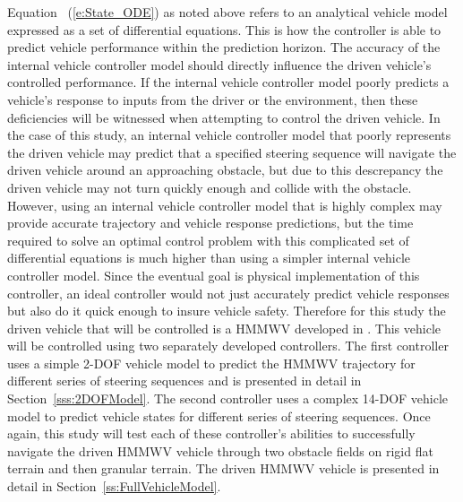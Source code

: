 \documentclass[12pt,twocolumn]{article}
\newcommand{\CHRONO}{{\sffamily{{Chrono}}}}
\begin{document}
Equation ~(\ref{e:State_ODE}) as noted above refers to an analytical vehicle model expressed as a set of differential equations. This is how the controller is able to predict vehicle performance within the prediction horizon. The accuracy of the internal vehicle controller model should directly influence the driven vehicle's controlled performance. If the internal vehicle controller model poorly predicts a vehicle's response to inputs from the driver or the environment, then these deficiencies will be witnessed when attempting to control the driven vehicle. In the case of this study, an internal vehicle controller model that poorly represents the driven vehicle may predict that a specified steering sequence will navigate the driven vehicle around an approaching obstacle, but due to this descrepancy the driven vehicle may not turn quickly enough and collide with the obstacle. However, using an internal vehicle controller model that is highly complex may provide accurate trajectory and vehicle response predictions, but the time required to solve an optimal control problem with this complicated set of differential equations is much higher than using a simpler internal vehicle controller model. Since the eventual goal is physical implementation of this controller, an ideal controller would not just accurately predict vehicle responses but also do it quick enough to insure vehicle safety. Therefore for this study the driven vehicle that will be controlled is a HMMWV developed in {\CHRONO}.  This vehicle will be controlled using two separately developed controllers. The first controller uses a simple 2-DOF vehicle model to predict the {\CHRONO}  HMMWV trajectory for different series of steering sequences and is presented in detail in Section~\ref{sss:2DOFModel}. The second controller uses a complex 14-DOF vehicle model to predict vehicle states for different series of steering sequences. Once again, this study will test each of these controller's abilities to successfully navigate the driven {\CHRONO}  HMMWV vehicle through two obstacle fields on rigid flat terrain and then granular terrain. The driven {\CHRONO} HMMWV vehicle is presented in detail in Section~\ref{ss:FullVehicleModel}.
\end{document}
